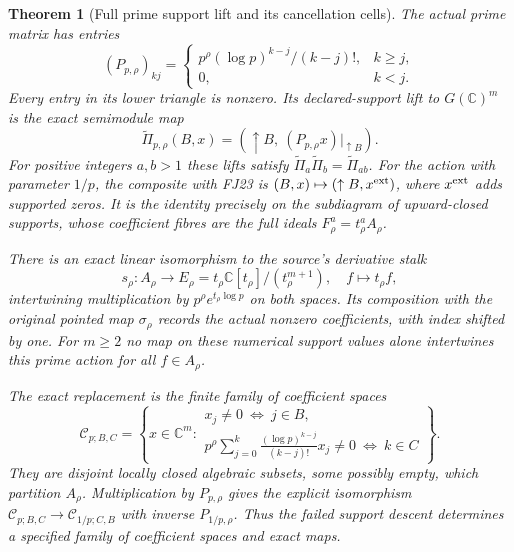 \documentclass[11pt,a4paper]{article}
\newtheorem{theorem}{Theorem}[section]
\theoremstyle{definition}\newtheorem{definition}[theorem]{Definition}
\newcommand{\C}{\mathbb C}\newcommand{\R}{\mathbb R}
\begin{document}
\begin{theorem}[Full prime support lift and its cancellation cells]
\label{fj:thm:prime-support}
The actual prime matrix has entries
\[
 (P_{p,\rho})_{kj}=
 \begin{cases}p^\rho(\log p)^{k-j}/(k-j)!,&k\ge j,\\0,&k<j.
 \end{cases}
 \tag{FJ22}\label{fj:fj:prime-matrix}
\]
Every entry in its lower triangle is nonzero. Its declared-support
lift to $G(\C)^m$ is the exact semimodule map
\[
 \widetilde\Pi_{p,\rho}(B,x)
   =(\uparrow B,\ (P_{p,\rho}x)|_{\uparrow B}).
 \tag{FJ23}\label{fj:fj:supported-prime}
\]
For positive integers $a,b>1$ these lifts satisfy
$\widetilde\Pi_a\widetilde\Pi_b=\widetilde\Pi_{ab}$.
For the action with parameter $1/p$, the composite with FJ23 is
$(B,x)\mapsto(\uparrow B,x^{\rm ext})$, where $x^{\rm ext}$ adds
supported zeros. It is the identity precisely on the subdiagram of
upward-closed supports, whose coefficient fibres are the full ideals
$F^a_\rho=t_\rho^aA_\rho$.

There is an exact linear isomorphism to the source's derivative stalk
\[
 s_\rho:A_\rho\longrightarrow E_\rho=t_\rho\C[t_\rho]/(t_\rho^{m+1}),
       \quad f\longmapsto t_\rho f,
 \tag{FJ24}
\]
intertwining multiplication by $p^\rho e^{t_\rho\log p}$ on both
spaces. Its composition with the original pointed map $\sigma_\rho$
records the actual nonzero coefficients, with index shifted by one.
For $m\ge2$ no map on these numerical support values alone
intertwines this prime action for all $f\in A_\rho$.

The exact replacement is the finite family of coefficient spaces
\[
 \mathcal C_{p;B,C}=\left\{x\in\C^m:
 \begin{array}{ll}
 x_j\ne0\ \Longleftrightarrow\ j\in B,\\
 \displaystyle p^\rho\sum_{j=0}^k
     \frac{(\log p)^{k-j}}{(k-j)!}x_j\ne0
       \ \Longleftrightarrow\ k\in C
 \end{array}\right\}.
 \tag{FJ25}\label{fj:fj:cells}
\]
They are disjoint locally closed algebraic subsets, some possibly
empty, which partition $A_\rho$. Multiplication by $P_{p,\rho}$
gives the explicit isomorphism
$\mathcal C_{p;B,C}\to\mathcal C_{1/p;C,B}$ with inverse
$P_{1/p,\rho}$. Thus the failed support descent determines a
specified family of coefficient spaces and exact maps.
\end{theorem}
\end{document}
